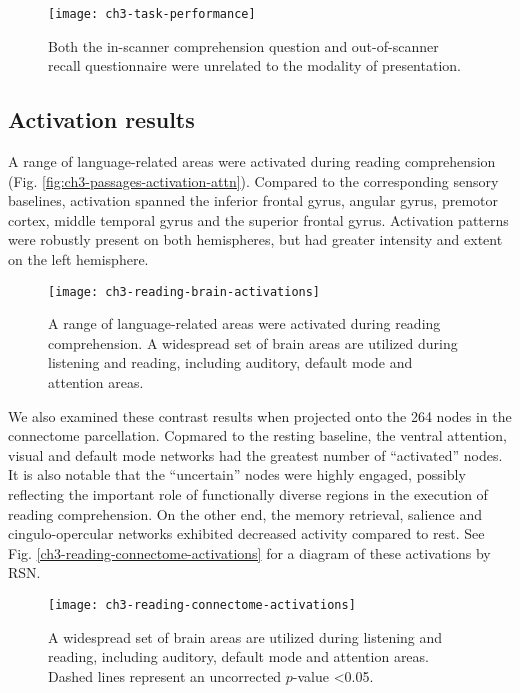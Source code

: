 \begin{figure}[t]
	\centering
	\texttt{[image: ch3-task-performance]}
    \caption[Behavioral metrics of passage performance were unrelated to modality.]{Both the in-scanner comprehension question and out-of-scanner recall questionnaire were unrelated to the modality of presentation.}
	\label{fig:ch3-task-performance}
\end{figure}

\subsection{Activation results}

A range of language-related areas were activated during reading comprehension (Fig. \ref{fig:ch3-passages-activation-attn}). Compared to the corresponding sensory baselines, activation spanned the inferior frontal gyrus, angular gyrus, premotor cortex, middle temporal gyrus and the superior frontal gyrus. Activation patterns were robustly present on both hemispheres, but had greater intensity and extent on the left hemisphere. 

\begin{figure}[t]
	\centering
	\texttt{[image: ch3-reading-brain-activations]}
    \caption[A range of language-related areas were activated during reading comprehension.]{A range of language-related areas were activated during reading comprehension. A widespread set of brain areas are utilized during listening and reading, including auditory, default mode and attention areas.}
	\label{fig:ch3-reading-brain-activations}
\end{figure}

We also examined these contrast results when projected onto the 264 nodes in the connectome parcellation. Copmared to the resting baseline, the ventral attention, visual and default mode networks had the greatest number of ``activated'' nodes. It is also notable that the ``uncertain'' nodes were highly engaged, possibly reflecting the important role of functionally diverse regions in the execution of reading comprehension. On the other end, the memory retrieval, salience and cingulo-opercular networks exhibited decreased activity compared to rest. See Fig. \ref{ch3-reading-connectome-activations} for a diagram of these activations by RSN. 

\begin{figure}[t]
	\centering
	\texttt{[image: ch3-reading-connectome-activations]}
    \caption[Distribution of reading-related activity among RSN nodes.]{A widespread set of brain areas are utilized during listening and reading, including auditory, default mode and attention areas. Dashed lines represent an uncorrected $p$-value \textless 0.05.}
	\label{fig:ch3-reading-connectome-activations}
\end{figure}


